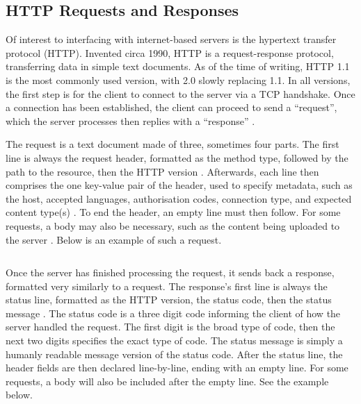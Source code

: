 \documentclass[11pt]{article}
\begin{document}
\subsection{HTTP Requests and Responses}    \label{sec:http}

Of interest to interfacing with internet-based servers is the hypertext transfer protocol (HTTP). Invented circa 1990, HTTP is a request-response protocol, transferring data in simple text documents. As of the time of writing, HTTP 1.1 is the most commonly used version, with 2.0 slowly replacing 1.1. In all versions, the first step is for the client to connect to the server via a TCP handshake. Once a connection has been established, the client can proceed to send a ``request'', which the server processes then replies with a ``response'' \cite{http-message}.

The request is a text document made of three, sometimes four parts. The first line is always the request header, formatted as the method type, followed by the path to the resource, then the HTTP version \cite{http-message}. Afterwards, each line then comprises the one key-value pair of the header, used to specify metadata, such as the host, accepted languages, authorisation codes, connection type, and expected content type(s) \cite{http-message}. To end the header, an empty line must then follow. For some requests, a body may also be necessary, such as the content being uploaded to the server \cite{http-message}. Below is an example of such a request.

\vspace{0.5\baselineskip}

\inputminted[linenos=true]{html}{http_examples/post_request.html}

Once the server has finished processing the request, it sends back a response, formatted very similarly to a request. The response's first line is always the status line, formatted as the HTTP version, the status code, then the status message \cite{http-response}. The status code is a three digit code informing the client of how the server handled the request. The first digit is the broad type of code, then the next two digits specifies the exact type of code. The status message is simply a humanly readable message version of the status code. After the status line, the header fields are then declared line-by-line, ending with an empty line. For some requests, a body will also be included after the empty line. See the example below.

\vspace{0.5\baselineskip}
\end{document}
